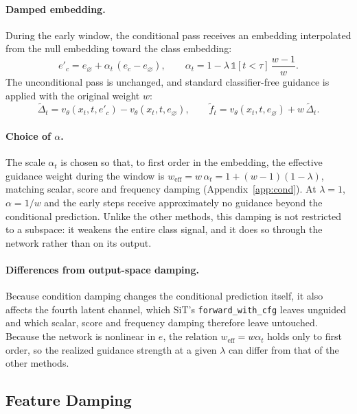 \documentclass[sigconf,nonacm]{acmart}
\newcommand{\ind}[1]{\mathbb{1}[#1]}
\begin{document}
\paragraph{Damped embedding.}
During the early window, the conditional pass receives an embedding interpolated from the null embedding toward the class embedding:
\begin{equation}
  e'_c = e_\varnothing + \alpha_t\,(e_c - e_\varnothing),
  \qquad
  \alpha_t = 1 - \lambda\, \ind{t < \tau}\, \frac{w-1}{w} .
  \label{eq:cond-embed}
\end{equation}
The unconditional pass is unchanged, and standard classifier-free guidance is applied with the original weight $w$:
\begin{equation}
  \tilde{\Delta}_t = v_\theta(x_t, t, e'_c) - v_\theta(x_t, t, e_\varnothing),
  \qquad
  \tilde{f}_t = v_\theta(x_t, t, e_\varnothing) + w\,\tilde{\Delta}_t .
  \label{eq:cond-guided}
\end{equation}

\paragraph{Choice of $\alpha$.}
The scale $\alpha_t$ is chosen so that, to first order in the embedding, the effective guidance weight during the window is $w_{\text{eff}} = w\,\alpha_t = 1 + (w-1)(1-\lambda)$, matching scalar, score and frequency damping (Appendix~\ref{app:cond}). At $\lambda = 1$, $\alpha = 1/w$ and the early steps receive approximately no guidance beyond the conditional prediction. Unlike the other methods, this damping is not restricted to a subspace: it weakens the entire class signal, and it does so through the network rather than on its output.

\paragraph{Differences from output-space damping.}
Because condition damping changes the conditional prediction itself, it also affects the fourth latent channel, which SiT's \texttt{forward\_with\_cfg} leaves unguided and which scalar, score and frequency damping therefore leave untouched. Because the network is nonlinear in $e$, the relation $w_{\text{eff}} = w\alpha_t$ holds only to first order, so the realized guidance strength at a given $\lambda$ can differ from that of the other methods.

\subsection{Feature Damping}
\label{sec:feature}
\end{document}
